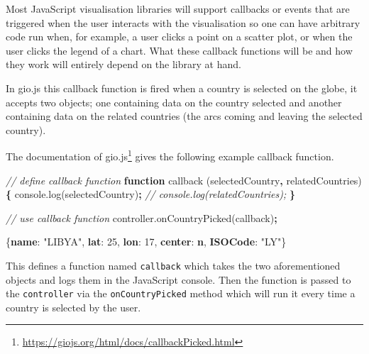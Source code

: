 \documentclass[
]{krantz}
\makeatletter
\newenvironment{Shaded}{\begin{snugshade}}{\end{snugshade}}
\newcommand{\AttributeTok}[1]{\textcolor[rgb]{0.61,0.61,0.61}{#1}}
\newcommand{\CommentTok}[1]{\textcolor[rgb]{0.37,0.37,0.37}{\textit{#1}}}
\newcommand{\DecValTok}[1]{\textcolor[rgb]{0.06,0.06,0.06}{#1}}
\newcommand{\ErrorTok}[1]{\textcolor[rgb]{0.14,0.14,0.14}{\textbf{#1}}}
\newcommand{\FunctionTok}[1]{\textcolor[rgb]{0,0,0}{#1}}
\newcommand{\KeywordTok}[1]{\textcolor[rgb]{0.27,0.27,0.27}{\textbf{#1}}}
\newcommand{\NormalTok}[1]{#1}
\newcommand{\OperatorTok}[1]{\textcolor[rgb]{0.43,0.43,0.43}{\textbf{#1}}}
\newcommand{\StringTok}[1]{\textcolor[rgb]{0.5,0.5,0.5}{#1}}
\newcommand{\VariableTok}[1]{\textcolor[rgb]{0,0,0}{#1}}
\renewcommand{\href}[2]{#2\footnote{\url{#1}}}
\newenvironment{kframe}{%
\medskip{}
\setlength{\fboxsep}{.8em}
 \def\at@end@of@kframe{}%
 \ifinner\ifhmode%
  \def\at@end@of@kframe{\end{minipage}}%
  \begin{minipage}{\columnwidth}%
 \fi\fi%
 \def\FrameCommand##1{\hskip\@totalleftmargin \hskip-\fboxsep
 \colorbox{shadecolor}{##1}\hskip-\fboxsep
     \hskip-\linewidth \hskip-\@totalleftmargin \hskip\columnwidth}%
 \MakeFramed {\advance\hsize-\width
   \@totalleftmargin\z@ \linewidth\hsize
   \@setminipage}}%
 {\par\unskip\endMakeFramed%
 \at@end@of@kframe}
\renewenvironment{Shaded}{\begin{kframe}}{\end{kframe}}
\makeatother
\begin{document}
Most JavaScript visualisation libraries will support callbacks or events that are triggered when the user interacts with the visualisation so one can have arbitrary code run when, for example, a user clicks a point on a scatter plot, or when the user clicks the legend of a chart. What these callback functions will be and how they work will entirely depend on the library at hand.

In gio.js this callback function is fired when a country is selected on the globe, it accepts two objects; one containing data on the country selected and another containing data on the related countries (the arcs coming and leaving the selected country).

The \href{https://giojs.org/html/docs/callbackPicked.html}{documentation of gio.js} gives the following example callback function.

\begin{Shaded}
\begin{Highlighting}[]
\CommentTok{// define callback function}
\KeywordTok{function} \AttributeTok{callback}\NormalTok{ (selectedCountry}\OperatorTok{,}\NormalTok{ relatedCountries) }\OperatorTok{\{}
  \VariableTok{console}\NormalTok{.}\AttributeTok{log}\NormalTok{(selectedCountry)}\OperatorTok{;}
  \CommentTok{// console.log(relatedCountries);}
\OperatorTok{\}}

\CommentTok{// use callback function}
\VariableTok{controller}\NormalTok{.}\AttributeTok{onCountryPicked}\NormalTok{(callback)}\OperatorTok{;}
\end{Highlighting}
\end{Shaded}

\begin{Shaded}
\begin{Highlighting}[]
\FunctionTok{\{}\ErrorTok{name}\FunctionTok{:} \StringTok{"LIBYA"}\FunctionTok{,} \ErrorTok{lat}\FunctionTok{:} \DecValTok{25}\FunctionTok{,} \ErrorTok{lon}\FunctionTok{:} \DecValTok{17}\FunctionTok{,} \ErrorTok{center}\FunctionTok{:} \ErrorTok{n}\FunctionTok{,} \ErrorTok{ISOCode}\FunctionTok{:} \StringTok{"LY"}\FunctionTok{\}}
\end{Highlighting}
\end{Shaded}

This defines a function named \texttt{callback} which takes the two aforementioned objects and logs them in the JavaScript console. Then the function is passed to the \texttt{controller} via the \texttt{onCountryPicked} method which will run it every time a country is selected by the user.
\end{document}
